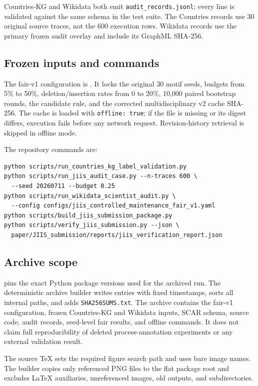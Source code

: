 \documentclass[pdflatex,sn-basic]{sn-jnl}
\begin{document}
Countries-KG and Wikidata both emit \texttt{audit\_records.jsonl}; every line is validated against the same schema in the test suite. The Countries records use 30 original source traces, not the 600 execution rows. Wikidata records use the primary frozen audit overlay and include its GraphML SHA-256.

\subsection{Frozen inputs and commands}

The fair-v1 configuration is . It locks the original 30 motif seeds, budgets from 5\% to 50\%, deletion/insertion rates from 0 to 20\%, 10,000 paired bootstrap rounds, the candidate rule, and the corrected multidisciplinary v2 cache SHA-256. The cache is loaded with \texttt{offline: true}; if the file is missing or its digest differs, execution fails before any network request. Revision-history retrieval is skipped in offline mode.

The repository commands are:
\begin{verbatim}
python scripts/run_countries_kg_label_validation.py
python scripts/run_jiis_audit_case.py --n-traces 600 \
  --seed 20260711 --budget 0.25
python scripts/run_wikidata_scientist_audit.py \
  --config configs/jiis_controlled_maintenance_fair_v1.yaml
python scripts/build_jiis_submission_package.py
python scripts/verify_jiis_submission.py --json \
  paper/JIIS_submission/reports/jiis_verification_report.json
\end{verbatim}

\subsection{Archive scope}

\enlargethispage{3\baselineskip}

 pins the exact Python package versions used for the archived run. The deterministic archive builder writes entries with fixed timestamps, sorts all internal paths, and adds \texttt{SHA256SUMS.txt}. The archive contains the fair-v1 configuration, frozen Countries-KG and Wikidata inputs, SCAR schema, source code, audit records, seed-level fair results, and offline commands. It does not claim full reproducibility of deleted process-annotation experiments or any external validation result.

The source TeX sets the required figure search path and uses bare image names. The builder copies only referenced PNG files to the flat package root and excludes LaTeX auxiliaries, unreferenced images, old outputs, and subdirectories.
\end{document}
